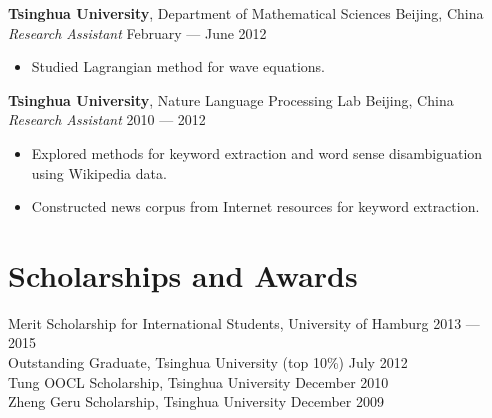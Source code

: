 \documentclass[a4paper,9pt]{extarticle} %
\begin{document}

\textbf{Tsinghua University}, Department of Mathematical Sciences \hfill Beijing, China \\
\textit{Research Assistant} \hfill February --- June 2012
\vspace{-\parskip}
\begin{itemize}
  \item Studied Lagrangian method for wave equations.
\end{itemize}


\textbf{Tsinghua University}, Nature Language Processing Lab \hfill Beijing, China \\
\textit{Research Assistant} \hfill 2010 --- 2012
\vspace{-\parskip}
\begin{itemize}
  \item Explored methods for keyword extraction and word sense disambiguation using Wikipedia data.
  \item Constructed news corpus from Internet resources for keyword extraction.
\end{itemize}


\section{Scholarships and Awards}

Merit Scholarship for International Students, University of Hamburg \hfill 2013 --- 2015 \\
Outstanding Graduate, Tsinghua University (top 10\%) \hfill July 2012 \\
Tung OOCL Scholarship, Tsinghua University \hfill December 2010  \\
Zheng Geru Scholarship, Tsinghua University \hfill December 2009

\fi

\end{document}
